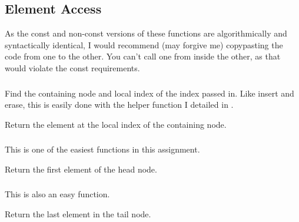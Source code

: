\subsection{Element Access}

\indent As the const and non-const versions of these functions are algorithmically
and syntactically identical, I would recommend (may  forgive me)
copy\/pasting the code from one to the other. You can't call one from inside
the other, as that would violate the const requirements.

\subsubsection{}
Find the containing node and local index of the index passed in. Like
insert and erase, this is easily done with the  helper
function I detailed in .

Return the element at the local index of the containing node.

\subsubsection{}
This is one of the easiest functions in this assignment.

Return the first element of the head node.

\subsubsection{}
This is also an easy function.

Return the last element in the tail node.
